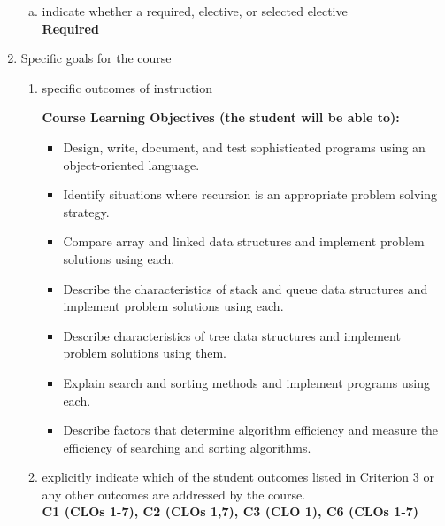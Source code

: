 \begin{enumerate}[1.]
\begin{enumerate}[a.]
\item indicate whether a required, elective, or selected elective\\ %
  {\bfseries
    Required
  }

\end{enumerate}

\item Specific goals for the course
\begin{enumerate}
\item specific outcomes of instruction\\ %
  {\bfseries
    Course Learning Objectives (the student will be able to):
    \begin{itemize}
     	 \item Design, write, document, and test sophisticated programs using an object-oriented language.
   	 \item Identify situations where recursion is an appropriate problem solving strategy.
   	 \item Compare array and linked data structures and implement problem solutions using each.
   	 \item Describe the characteristics of stack and queue data structures and implement problem solutions using each.
   	 \item Describe characteristics of tree data structures and implement problem solutions using them.
   	 \item Explain search and sorting methods and implement programs using each.
   	 \item Describe factors that determine algorithm efficiency and measure the efficiency of searching and sorting algorithms.
    \end{itemize}
  }

\item explicitly indicate which of the student outcomes listed in Criterion 3 or any other outcomes are addressed by the course.\\
  {\bfseries
    C1 (CLOs 1-7), 
    C2 (CLOs 1,7),
    C3 (CLO 1), 
    C6 (CLOs 1-7)
  }
\end{enumerate}


\end{enumerate}
